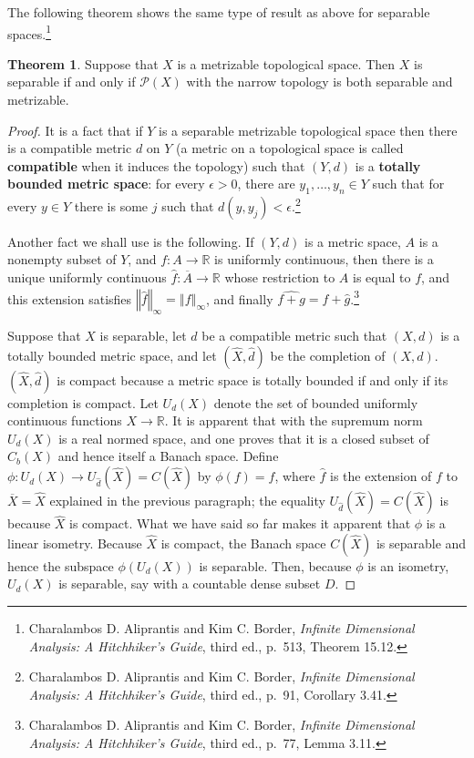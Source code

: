 \documentclass{article}
\newcommand{\norm}[1]{\left\Vert #1 \right\Vert}
\theoremstyle{definition}
\newtheorem{theorem}{Theorem}
\theoremstyle{definition}
\begin{document}
The following theorem shows the same type of result as above for separable spaces.\footnote{Charalambos D. 
Aliprantis and Kim C. Border, {\em Infinite Dimensional Analysis: A Hitchhiker's Guide}, third ed., p.~513, Theorem 15.12.}

\begin{theorem}
Suppose that $X$ is a metrizable topological space. Then $X$ is separable if and only if $\mathscr{P}(X)$ with the narrow topology  is
both separable and metrizable.
\label{Pseparable}
\end{theorem}
\begin{proof}
It is a fact that if $Y$ is a separable metrizable topological space then there is a compatible metric $d$ on $Y$ (a metric
on a topological space is called \textbf{compatible} when it induces the topology) such that $(Y,d)$ is a \textbf{totally bounded metric space}:
for every $\epsilon>0$, there are $y_1,\ldots,y_n \in Y$ such that for every $y \in Y$ there is some $j$ such that $d(y,y_j)<\epsilon$.\footnote{Charalambos D. 
Aliprantis and Kim C. Border, {\em Infinite Dimensional Analysis: A Hitchhiker's Guide}, third ed., p.~91, Corollary 3.41.}

Another fact we shall use is the following. If $(Y,d)$ is a metric space, $A$ is a nonempty subset of $Y$, and
$f:A \to \mathbb{R}$ is uniformly continuous, then there is a unique uniformly continuous $\hat{f}:\overline{A} \to \mathbb{R}$
whose restriction to $A$ is equal to $f$, and this extension satisfies $\norm{\hat{f}}_\infty  = \norm{f}_\infty$, and finally $\widehat{f+g}=\hat{f}+\hat{g}$.\footnote{Charalambos D. 
Aliprantis and Kim C. Border, {\em Infinite Dimensional Analysis: A Hitchhiker's Guide}, third ed., p.~77, Lemma 3.11.}

Suppose that $X$ is separable, let $d$ be a compatible metric such that $(X,d)$ is a totally bounded metric space,
and let $(\hat{X},\hat{d})$ be the completion of $(X,d)$. $(\hat{X},\hat{d})$ is compact because a metric space is totally bounded if and only if its
completion is compact. Let $U_d(X)$ denote the set of bounded uniformly continuous functions $X \to \mathbb{R}$. It is apparent that with the supremum
norm $U_d(X)$ is a real normed space, and one proves that it is a closed subset of $C_b(X)$ and hence itself a Banach space.
Define $\phi:U_d(X) \to U_{\hat{d}}(\hat{X})=C(\hat{X})$ by $\phi(f)=\hat{f}$, where $\hat{f}$ is the extension of $f$ to $\overline{X}=\hat{X}$ explained in the previous paragraph;
the equality $U_{\hat{d}}(\hat{X})=C(\hat{X})$ is because $\hat{X}$ is compact. What we have said so far makes it apparent that  $\phi$ is a linear isometry.
Because $\hat{X}$ is compact, the Banach space $C(\hat{X})$ is separable
and hence the subspace $\phi(U_d(X))$  is separable. Then, because $\phi$ is an isometry,
$U_d(X)$ is separable, say with a countable dense subset
$D$. 


\end{proof}
\end{document}
